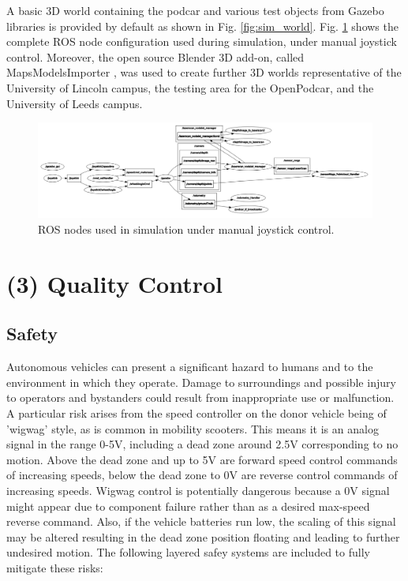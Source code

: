 \documentclass[a4paper]{article}
\begin{document}
	A basic 3D world containing the podcar and various test objects from Gazebo libraries is provided by default as shown in Fig. \ref{fig:sim_world}. Fig. \ref{fig:sim_nodes} shows the complete ROS node configuration used during simulation, under manual joystick control. Moreover, the open source Blender 3D add-on, called MapsModelsImporter \cite{michelmaps}, was used to create further 3D worlds representative of the University of Lincoln campus, the testing area for the OpenPodcar, and the University of Leeds campus.
	
	\begin{figure}[h]
		\includegraphics[width=\columnwidth]{figs_sim/sim_nodes.png}
		\caption{ROS nodes used in simulation under manual joystick control.}
		\label{fig:sim_nodes}
	\end{figure}
	
	\section{(3) Quality Control}\label{h.f8237gmzmwc6}
	
	\subsection{Safety}\label{h.v60aduckfisj}
	
	Autonomous vehicles can present a significant hazard to humans and to the environment in which they operate. Damage to surroundings and possible injury to operators and bystanders could result from inappropriate use or malfunction. A particular risk arises from the speed controller on the donor vehicle being of 'wigwag' style, as is common in mobility scooters. This means it is an analog signal in the range 0-5V, including a dead zone around 2.5V corresponding to no motion. Above the dead zone and up to 5V are forward speed control commands of increasing speeds, below the dead zone to 0V are reverse control commands of increasing speeds. Wigwag control is  potentially dangerous because a 0V signal might appear due to component failure rather than as a desired max-speed reverse command. Also, if the vehicle batteries run low, the scaling of this signal may be altered resulting in the dead zone position floating and leading to further undesired motion. The following layered safey systems are included to fully mitigate these risks:
	
\end{document}
